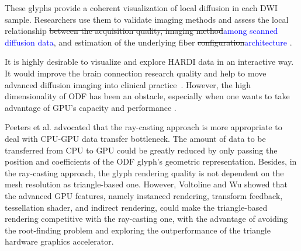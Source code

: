 \documentclass[twoside,twocolumn,10pt]{article}
\begin{document}

These glyphs provide a coherent visualization of local diffusion in each DWI sample. Researchers use them to validate imaging methods \cite{descoteaux2007_QBI,  TuchQBall2004,tournier2007,Tournier2004DirectEO, tuch2002,  yeh2010} and assess the local relationship \sout{between the acquisition quality, imaging method}\textcolor{blue}{among scanned diffusion data}, and estimation of the underlying fiber \sout{configuration}\textcolor{blue}{architecture} \cite{cho2008, daducci2014,descoteaux2007, vega2009,Vaillancourt2015}. %

It is highly desirable to visualize and explore HARDI data in an interactive way. It would improve the brain connection research quality and help to move advanced diffusion imaging into clinical practice\textcolor{red}{~\cite{???}}. However, the high dimensionality of ODF has been an obstacle, especially when one wants to take advantage of GPU's capacity and performance \cite{peeters2009}.

Peeters et al. \cite{peeters2009} advocated that the ray-casting approach is more appropriate to deal with CPU-GPU data transfer bottleneck. The amount of data to be transferred from CPU to GPU could be greatly reduced by only passing the position and coefficients of the ODF glyph's geometric representation. Besides, in the ray-casting approach, the glyph rendering quality is not dependent on the mesh resolution as triangle-based one. However, Voltoline and Wu showed that the advanced GPU features, namely instanced rendering, transform feedback, tessellation shader, and indirect rendering, could make the triangle-based rendering competitive with the ray-casting one, with the advantage of avoiding the root-finding problem and exploring the outperformance of the triangle hardware graphics accelerator.
\end{document}

